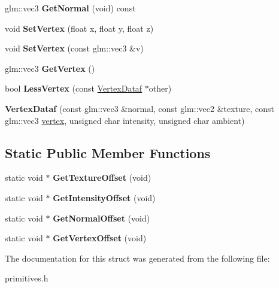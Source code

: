 \begin{DoxyCompactItemize}
\item 
\hypertarget{structVertexDataf_a94b8bce2afb9f8ce5b38ed86d07abb53}{glm\-::vec3 {\bfseries \-Get\-Normal} (void) const }\label{structVertexDataf_a94b8bce2afb9f8ce5b38ed86d07abb53}

\item 
\hypertarget{structVertexDataf_a1d99ccc06ecf40ee026cbc6e98b26bc0}{void {\bfseries \-Set\-Vertex} (float x, float y, float z)}\label{structVertexDataf_a1d99ccc06ecf40ee026cbc6e98b26bc0}

\item 
\hypertarget{structVertexDataf_a3db40b1dda607d80743b25be545dfc1b}{void {\bfseries \-Set\-Vertex} (const glm\-::vec3 \&v)}\label{structVertexDataf_a3db40b1dda607d80743b25be545dfc1b}

\item 
\hypertarget{structVertexDataf_afcc60d12a1ddebd26b480b94d435961c}{glm\-::vec3 {\bfseries \-Get\-Vertex} ()}\label{structVertexDataf_afcc60d12a1ddebd26b480b94d435961c}

\item 
\hypertarget{structVertexDataf_aaa7543edaac396c7de761c711471ca53}{bool {\bfseries \-Less\-Vertex} (const \hyperlink{structVertexDataf}{\-Vertex\-Dataf} $\ast$other)}\label{structVertexDataf_aaa7543edaac396c7de761c711471ca53}

\item 
\hypertarget{structVertexDataf_ab12a4a8cf155bd05b229df8c57226670}{{\bfseries \-Vertex\-Dataf} (const glm\-::vec3 \&normal, const glm\-::vec2 \&texture, const glm\-::vec3 \hyperlink{structvertex}{vertex}, unsigned char intensity, unsigned char ambient)}\label{structVertexDataf_ab12a4a8cf155bd05b229df8c57226670}

\end{DoxyCompactItemize}
\subsection*{\-Static \-Public \-Member \-Functions}
\begin{DoxyCompactItemize}
\item 
\hypertarget{structVertexDataf_a188acd301ca1aa3564758e1f845fb078}{static void $\ast$ {\bfseries \-Get\-Texture\-Offset} (void)}\label{structVertexDataf_a188acd301ca1aa3564758e1f845fb078}

\item 
\hypertarget{structVertexDataf_a13a4f35ed3215acf6352b958ef921f08}{static void $\ast$ {\bfseries \-Get\-Intensity\-Offset} (void)}\label{structVertexDataf_a13a4f35ed3215acf6352b958ef921f08}

\item 
\hypertarget{structVertexDataf_a192cb6687897de52c321d7038ef0c8b5}{static void $\ast$ {\bfseries \-Get\-Normal\-Offset} (void)}\label{structVertexDataf_a192cb6687897de52c321d7038ef0c8b5}

\item 
\hypertarget{structVertexDataf_a37474c2b710e411be42cb6c89371e8b8}{static void $\ast$ {\bfseries \-Get\-Vertex\-Offset} (void)}\label{structVertexDataf_a37474c2b710e411be42cb6c89371e8b8}

\end{DoxyCompactItemize}


\-The documentation for this struct was generated from the following file\-:\begin{DoxyCompactItemize}
\item 
primitives.\-h\end{DoxyCompactItemize}
